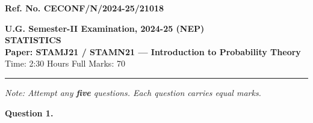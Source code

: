 \documentclass[11pt,a4paper]{article}
\begin{document}
\begin{flushright}
  \small   \textbf{Ref. No. CECONF/N/2024-25/21018}
\end{flushright}


\begin{center}
  {\large\bfseries U.G. Semester-II Examination, 2024-25 (NEP)}\\[4pt]
  {\large\bfseries STATISTICS}\\[4pt]
  {\large\bfseries Paper: STAMJ21 / STAMN21 --- Introduction to Probability Theory}\\[4pt]
  {\normalsize Time: 2:30 Hours \hfill Full Marks: 70}
\end{center}

\rule{\linewidth}{0.4pt}\smallskip



\noindent   \textit{Note: Attempt any   \textbf{five} questions. Each question carries equal marks.}
\bigskip




\noindent   \textbf{Question 1.}
\end{document}
